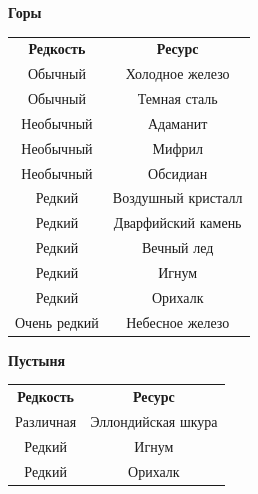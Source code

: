 \documentclass[a4paper, 9pt, twocolumn]{book}
\begin{document}
	\begin{table}[H]

		{\Large \textbf{Горы}}
		
		\centering
		
		\medspace 
		
		\begin{tabularx}{\linewidth}{C C}
			
			\textbf{Редкость} & \textbf{Ресурс} \\
			
			Обычный & Холодное железо \\
			
			Обычный & Темная сталь \\
			
			Необычный & Адаманит \\
			
			Необычный & Мифрил \\
			
			Необычный & Обсидиан \\
			
			Редкий & Воздушный кристалл \\
			
			Редкий & Дварфийский камень \\
			
			Редкий & Вечный лед \\
			
			Редкий & Игнум \\
			
			Редкий & Орихалк \\
			
			Очень редкий & Небесное железо \\
			
		\end{tabularx}
	\end{table}

	\begin{table}[H]

		{\Large \textbf{Пустыня}}
		
		\centering
		
		\medspace 
		
		\begin{tabularx}{\linewidth}{C C}
			
			\textbf{Редкость} & \textbf{Ресурс} \\
			
			Различная & Эллондийская шкура \\
			
			Редкий & Игнум \\
			
			Редкий & Орихалк  \\
			
		\end{tabularx}
	\end{table}
	
\end{document}
